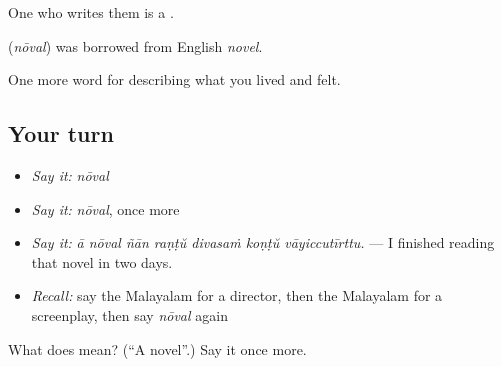 One who writes them is a .

\begin{cousinweb}
\textbf{} (\emph{nōval}) was borrowed from English \emph{novel}.
\end{cousinweb}

\begin{grammarlens}[title={What you've built}]
One more word for describing what you lived and felt.
\end{grammarlens}

\subsection*{Your turn}
\begin{itemize}
\raggedright
  \item \emph{Say it:} \emph{nōval}
  \item \emph{Say it:} \emph{nōval}, once more
  \item \emph{Say it:} \emph{ā nōval ñān raṇṭŭ divasaṁ koṇṭŭ vāyiccutīrttu.} — I finished reading that novel in two days.
  \item \emph{Recall:} say the Malayalam for a director, then the Malayalam for a screenplay, then say \emph{nōval} again
\end{itemize}

\begin{tcolorbox}[breakable,colback=teal!4,colframe=teal!35!black,title={Before you move on}]
What does  mean? (\textquotedblleft{}A novel\textquotedblright{}.) Say it once more.
\end{tcolorbox}
